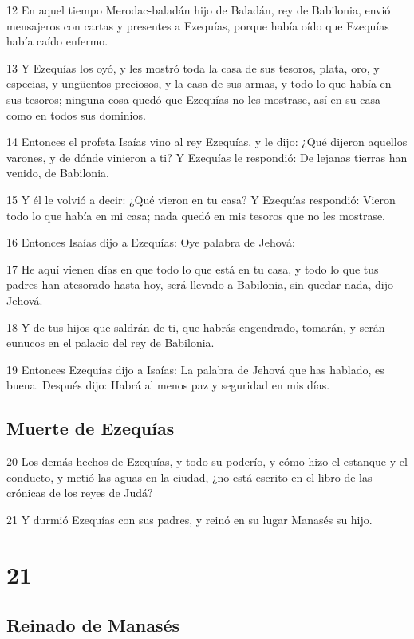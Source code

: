 \par 12 En aquel tiempo Merodac-baladán hijo de Baladán, rey de Babilonia, envió mensajeros con cartas y presentes a Ezequías, porque había oído que Ezequías había caído enfermo.
\par 13 Y Ezequías los oyó, y les mostró toda la casa de sus tesoros, plata, oro, y especias, y ungüentos preciosos, y la casa de sus armas, y todo lo que había en sus tesoros; ninguna cosa quedó que Ezequías no les mostrase, así en su casa como en todos sus dominios.
\par 14 Entonces el profeta Isaías vino al rey Ezequías, y le dijo: ¿Qué dijeron aquellos varones, y de dónde vinieron a ti? Y Ezequías le respondió: De lejanas tierras han venido, de Babilonia.
\par 15 Y él le volvió a decir: ¿Qué vieron en tu casa? Y Ezequías respondió: Vieron todo lo que había en mi casa; nada quedó en mis tesoros que no les mostrase.
\par 16 Entonces Isaías dijo a Ezequías: Oye palabra de Jehová:
\par 17 He aquí vienen días en que todo lo que está en tu casa, y todo lo que tus padres han atesorado hasta hoy, será llevado a Babilonia, sin quedar nada, dijo Jehová. 
\par 18 Y de tus hijos que saldrán de ti, que habrás engendrado, tomarán, y serán eunucos en el palacio del rey de Babilonia. 
\par 19 Entonces Ezequías dijo a Isaías: La palabra de Jehová que has hablado, es buena. Después dijo: Habrá al menos paz y seguridad en mis días.

\section*{Muerte de Ezequías}

\par 20 Los demás hechos de Ezequías, y todo su poderío, y cómo hizo el estanque y el conducto, y metió las aguas en la ciudad, ¿no está escrito en el libro de las crónicas de los reyes de Judá?
\par 21 Y durmió Ezequías con sus padres, y reinó en su lugar Manasés su hijo.

\chapter{21}

\section*{Reinado de Manasés}

